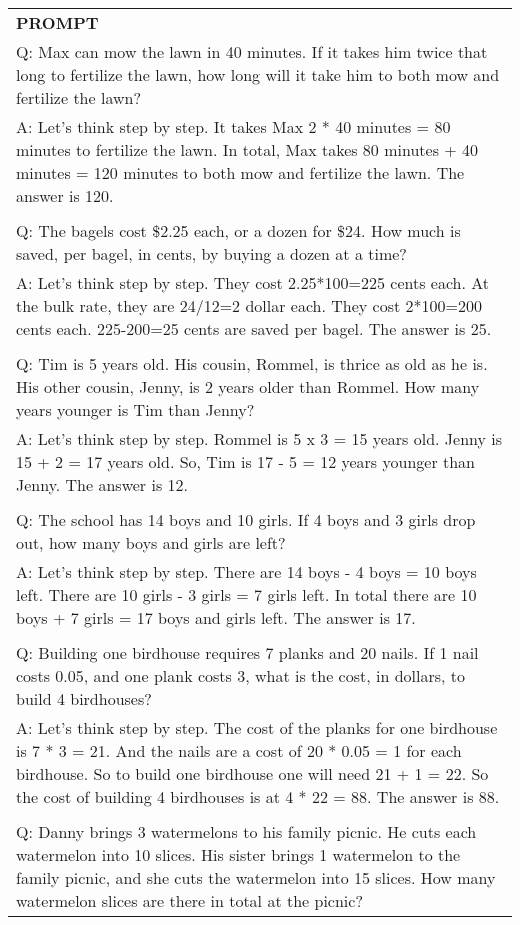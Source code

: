 \begin{table}[ht]
    \centering \small
\begin{tabular}{p{12cm}}
\toprule
\textbf{PROMPT}\\
Q: Max can mow the lawn in 40 minutes. If it takes him twice that long to fertilize the lawn, how long will it take him to both mow and fertilize the lawn?
\\A: Let's think step by step. It takes Max 2 * 40 minutes = 80 minutes to fertilize the lawn. In total, Max takes 80 minutes + 40 minutes = 120 minutes to both mow and fertilize the lawn. The answer is 120.
\\
\\Q: The bagels cost \$2.25 each, or a dozen for \$24. How much is saved, per bagel, in cents, by buying a dozen at a time?
\\A: Let's think step by step. They cost 2.25*100=225 cents each. At the bulk rate, they are 24/12=2 dollar each. They cost 2*100=200 cents each. 225-200=25 cents are saved per bagel. The answer is 25.
\\
\\Q: Tim is 5 years old. His cousin, Rommel, is thrice as old as he is. His other cousin, Jenny, is 2 years older than Rommel. How many years younger is Tim than Jenny?
\\A: Let's think step by step. Rommel is 5 x 3 = 15 years old. Jenny is 15 + 2 = 17 years old. So, Tim is 17 - 5 = 12 years younger than Jenny. The answer is 12.
\\
\\Q: The school has 14 boys and 10 girls. If 4 boys and 3 girls drop out, how many boys and girls are left?
\\A: Let's think step by step. There are 14 boys - 4 boys = 10 boys left. There are 10 girls - 3 girls = 7 girls left. In total there are 10 boys + 7 girls = 17 boys and girls left. The answer is 17.
\\
\\Q: Building one birdhouse requires 7 planks and 20 nails. If 1 nail costs 0.05, and one plank costs 3, what is the cost, in dollars, to build 4 birdhouses?
\\A: Let's think step by step. The cost of the planks for one birdhouse is 7 * 3 = 21. And the nails are a cost of 20 * 0.05 = 1 for each birdhouse. So to build one birdhouse one will need 21 + 1 = 22. So the cost of building 4 birdhouses is at 4 * 22 = 88. The answer is 88.
\\
\\Q: Danny brings 3 watermelons to his family picnic. He cuts each watermelon into 10 slices. His sister brings 1 watermelon to the family picnic, and she cuts the watermelon into 15 slices. How many watermelon slices are there in total at the picnic?

\end{tabular}
\end{table}
